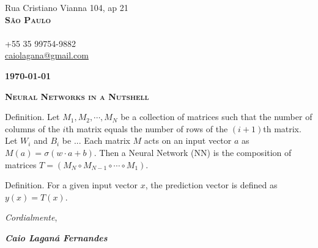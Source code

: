 \documentclass[twoside]{letter}
\begin{document}
\justifying

\parbox{\linewidth}
{
\begin{flushright}
Rua Cristiano Vianna 104, ap 21\\
\textbf{\textsc{São Paulo}}\\
\mbox{}\\
+55 35 99754-9882\\
\href{mailto:caiolagana@gmail.com}{caiolagana@gmail.com}
\end{flushright}
}

\textbf{\today}


\vspace{2em}

\begin{center}\textsc{\Large \textbf{Neural Networks in a Nutshell}}\end{center}

Definition. Let $M_1, M_2, \cdots, M_N$ be a collection of matrices such that the number of columns of the $i$th matrix equals the number of rows of the $(i+1)$th matrix. Let $W_i$ and $B_i$ be ... Each matrix $M$ acts on an input vector $a$ as $M(a)=\sigma(w\cdot a+b)$. Then a Neural Network (NN) is the composition of matrices $T = (M_N \circ M_{N-1} \circ \cdots \circ M_1)$.

Definition. For a given input vector $x$, the prediction vector is defined as $y(x) = T (x)$.


\bigskip

\emph{Cordialmente},

\vfill

    \parbox{\linewidth}
    {
    \begin{flushright}
        \textbf{\emph{Caio Laganá Fernandes}}
    \end{flushright}
    }
\end{document}
